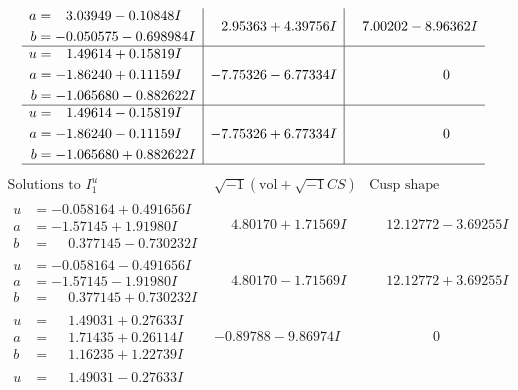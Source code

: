 \documentclass[1p]{elsarticle_modified}
\theoremstyle{definition}
\newcommand{\I}{\sqrt{-1}}
\begin{document}
$$\begin{array}{c|c|c}
\begin{aligned}
a &= \phantom{-}3.03949 - 0.10848 I \\
b &= -0.050575 - 0.698984 I\end{aligned}
 & \phantom{-}2.95363 + 4.39756 I & \phantom{-}7.00202 - 8.96362 I \\ \hline\begin{aligned}
u &= \phantom{-}1.49614 + 0.15819 I \\
a &= -1.86240 + 0.11159 I \\
b &= -1.065680 - 0.882622 I\end{aligned}
 & -7.75326 - 6.77334 I & \phantom{-0.000000 } 0 \\ \hline\begin{aligned}
u &= \phantom{-}1.49614 - 0.15819 I \\
a &= -1.86240 - 0.11159 I \\
b &= -1.065680 + 0.882622 I\end{aligned}
 & -7.75326 + 6.77334 I & \phantom{-0.000000 } 0\\
 \hline 
 \end{array}$$\newpage$$\begin{array}{c|c|c}  
\text{Solutions to }I^u_{1}& \I (\text{vol} + \sqrt{-1}CS) & \text{Cusp shape}\\
 \hline 
\begin{aligned}
u &= -0.058164 + 0.491656 I \\
a &= -1.57145 + 1.91980 I \\
b &= \phantom{-}0.377145 - 0.730232 I\end{aligned}
 & \phantom{-}4.80170 + 1.71569 I & \phantom{-}12.12772 - 3.69255 I \\ \hline\begin{aligned}
u &= -0.058164 - 0.491656 I \\
a &= -1.57145 - 1.91980 I \\
b &= \phantom{-}0.377145 + 0.730232 I\end{aligned}
 & \phantom{-}4.80170 - 1.71569 I & \phantom{-}12.12772 + 3.69255 I \\ \hline\begin{aligned}
u &= \phantom{-}1.49031 + 0.27633 I \\
a &= \phantom{-}1.71435 + 0.26114 I \\
b &= \phantom{-}1.16235 + 1.22739 I\end{aligned}
 & -0.89788 - 9.86974 I & \phantom{-0.000000 } 0 \\ \hline\begin{aligned}
u &= \phantom{-}1.49031 - 0.27633 I \\

\end{aligned}
\end{array}$$
\end{document}
